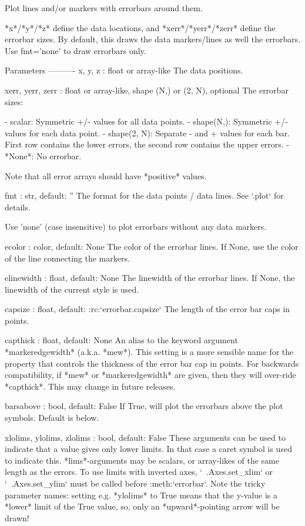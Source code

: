 \begin{DoxyVerb}Plot lines and/or markers with errorbars around them.

*x*/*y*/*z* define the data locations, and *xerr*/*yerr*/*zerr* define
the errorbar sizes. By default, this draws the data markers/lines as
well the errorbars. Use fmt='none' to draw errorbars only.

Parameters
----------
x, y, z : float or array-like
    The data positions.

xerr, yerr, zerr : float or array-like, shape (N,) or (2, N), optional
    The errorbar sizes:

    - scalar: Symmetric +/- values for all data points.
    - shape(N,): Symmetric +/-values for each data point.
    - shape(2, N): Separate - and + values for each bar. First row
      contains the lower errors, the second row contains the upper
      errors.
    - *None*: No errorbar.

    Note that all error arrays should have *positive* values.

fmt : str, default: ''
    The format for the data points / data lines. See `.plot` for
    details.

    Use 'none' (case insensitive) to plot errorbars without any data
    markers.

ecolor : color, default: None
    The color of the errorbar lines.  If None, use the color of the
    line connecting the markers.

elinewidth : float, default: None
    The linewidth of the errorbar lines. If None, the linewidth of
    the current style is used.

capsize : float, default: :rc:`errorbar.capsize`
    The length of the error bar caps in points.

capthick : float, default: None
    An alias to the keyword argument *markeredgewidth* (a.k.a. *mew*).
    This setting is a more sensible name for the property that
    controls the thickness of the error bar cap in points. For
    backwards compatibility, if *mew* or *markeredgewidth* are given,
    then they will over-ride *capthick*. This may change in future
    releases.

barsabove : bool, default: False
    If True, will plot the errorbars above the plot
    symbols. Default is below.

xlolims, ylolims, zlolims : bool, default: False
    These arguments can be used to indicate that a value gives only
    lower limits. In that case a caret symbol is used to indicate
    this. *lims*-arguments may be scalars, or array-likes of the same
    length as the errors. To use limits with inverted axes,
    `~.Axes.set_xlim` or `~.Axes.set_ylim` must be called before
    :meth:`errorbar`. Note the tricky parameter names: setting e.g.
    *ylolims* to True means that the y-value is a *lower* limit of the
    True value, so, only an *upward*-pointing arrow will be drawn!


\end{DoxyVerb}
